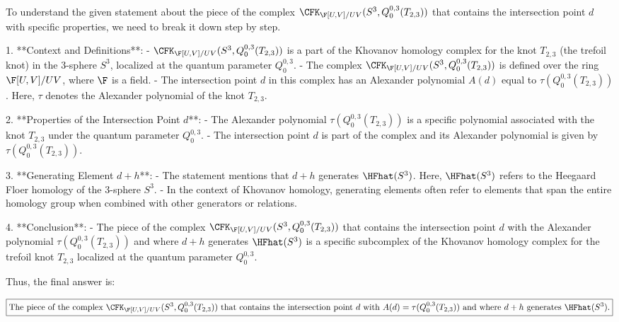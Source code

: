 To understand the given statement about the piece of the complex \(\CFK_{\F[U,V]/UV}(S^3,Q^{0,3}_0(T_{2,3}))\) that contains the intersection point \(d\) with specific properties, we need to break it down step by step.

1. **Context and Definitions**:
   - \(\CFK_{\F[U,V]/UV}(S^3,Q^{0,3}_0(T_{2,3}))\) is a part of the Khovanov homology complex for the knot \(T_{2,3}\) (the trefoil knot) in the 3-sphere \(S^3\), localized at the quantum parameter \(Q^{0,3}_0\).
   - The complex \(\CFK_{\F[U,V]/UV}(S^3,Q^{0,3}_0(T_{2,3}))\) is defined over the ring \(\F[U,V]/UV\), where \(\F\) is a field.
   - The intersection point \(d\) in this complex has an Alexander polynomial \(A(d)\) equal to \(\tau(Q^{0,3}_0(T_{2,3}))\). Here, \(\tau\) denotes the Alexander polynomial of the knot \(T_{2,3}\).

2. **Properties of the Intersection Point \(d\)**:
   - The Alexander polynomial \(\tau(Q^{0,3}_0(T_{2,3}))\) is a specific polynomial associated with the knot \(T_{2,3}\) under the quantum parameter \(Q^{0,3}_0\).
   - The intersection point \(d\) is part of the complex and its Alexander polynomial is given by \(\tau(Q^{0,3}_0(T_{2,3}))\).

3. **Generating Element \(d + h\)**:
   - The statement mentions that \(d + h\) generates \(\HFhat(S^3)\). Here, \(\HFhat(S^3)\) refers to the Heegaard Floer homology of the 3-sphere \(S^3\).
   - In the context of Khovanov homology, generating elements often refer to elements that span the entire homology group when combined with other generators or relations.

4. **Conclusion**:
   - The piece of the complex \(\CFK_{\F[U,V]/UV}(S^3,Q^{0,3}_0(T_{2,3}))\) that contains the intersection point \(d\) with the Alexander polynomial \(\tau(Q^{0,3}_0(T_{2,3}))\) and where \(d + h\) generates \(\HFhat(S^3)\) is a specific subcomplex of the Khovanov homology complex for the trefoil knot \(T_{2,3}\) localized at the quantum parameter \(Q^{0,3}_0\).

Thus, the final answer is:

\[
\boxed{\text{The piece of the complex } \CFK_{\F[U,V]/UV}(S^3,Q^{0,3}_0(T_{2,3})) \text{ that contains the intersection point } d \text{ with } A(d) = \tau(Q^{0,3}_0(T_{2,3})) \text{ and where } d + h \text{ generates } \HFhat(S^3).}
\]